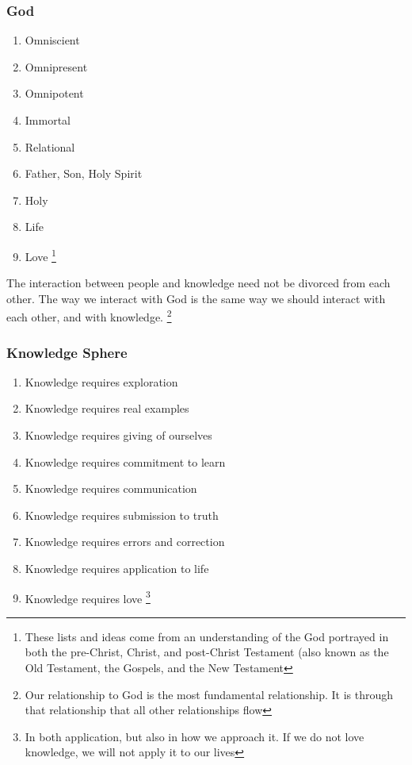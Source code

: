 \documentclass[CSHFoundation.tex]{subfiles}
\begin{document}
\subsubsection{God}

\begin{enumerate}
\item Omniscient
\item Omnipresent
\item Omnipotent
\item Immortal
\item Relational
\item Father, Son, Holy Spirit
\item Holy
\item Life
\item Love \footnote{These lists and ideas come from an understanding of the God portrayed in both the pre-Christ, Christ, and post-Christ Testament (also known as the Old Testament, the Gospels, and the New Testament}
\end{enumerate}

The interaction between people and knowledge need not be divorced from each other. The way we interact with God is the same way we should interact with each other, and with knowledge. \footnote{Our relationship to God is the most fundamental relationship. It is through that relationship that all other relationships flow}



\subsubsection{Knowledge Sphere}



\begin{enumerate}
\item Knowledge requires exploration
\item Knowledge requires real examples
\item Knowledge requires giving of ourselves
\item Knowledge requires commitment to learn
\item Knowledge requires communication
\item Knowledge requires submission to truth
\item Knowledge requires errors and correction
\item Knowledge requires application to life
\item Knowledge requires love \footnote{In both application, but also in how we approach it. If we do not love knowledge, we will not apply it to our lives}
\end{enumerate}
\end{document}
